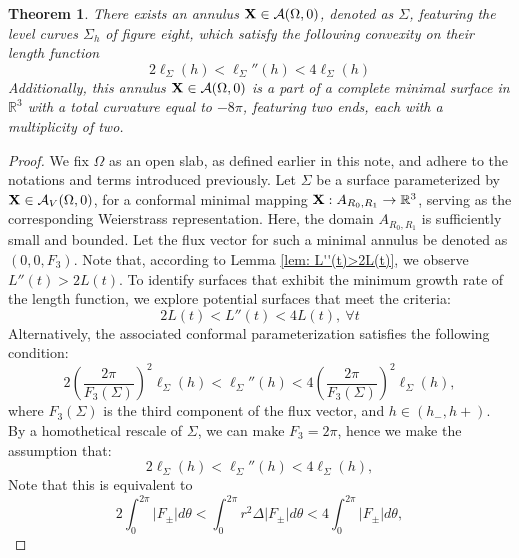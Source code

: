 \documentclass[11pt]{amsart}
\numberwithin{equation}{section}
\theoremstyle{theorem}
\newtheorem{theorem}{Theorem}[section]
\theoremstyle{definition}
\numberwithin{equation}{section}
\begin{document}
\begin{theorem} \label{thm: annulus in A(omega, 0)}
   There exists an annulus $\bold{X}\in \mathcal{A}(\Omega ,0)$, denoted as $\Sigma$, featuring 
   the level curves $\Sigma_h$ of figure eight, which satisfy the following convexity on their length function
   $$
   2\ell_{\Sigma}(h)<\ell_{\Sigma}''(h)<4\ell_{\Sigma}(h)
   $$
   Additionally, this annulus $\bold{X} \in \mathcal{A}(\Omega ,0)$ is a part of a complete minimal surface in $\mathbb{R}^3$ with a total curvature equal to $-8\pi$, featuring two ends, each with a multiplicity of two.
\end{theorem}
\begin{proof}
    We fix $\Omega$ as an open slab, as defined earlier in this note, and adhere to the notations and terms introduced previously.
    Let $\Sigma$ be a surface parameterized by $\bold{X}\in \mathcal{A}_V(\Omega ,0)$, for a conformal minimal mapping $\bold{X} : A_{R_0,R_1} \rightarrow \mathbb{R}^3$, serving as the corresponding Weierstrass representation. Here, the domain $A_{R_0,R_1}$ is sufficiently small and bounded. Let the flux vector for such a minimal annulus be denoted as $(0,0,F_3)$. Note that, according to Lemma \ref{lem: L''(t)>2L(t)}, we observe $L''(t) > 2L(t)$. To identify surfaces that exhibit the minimum growth rate of the length function, we explore potential surfaces that meet the criteria: 
\begin{equation} \label{ineq: L for wind. 0}
2L(t) < L''(t) < 4L(t),\ \forall t
\end{equation}
Alternatively, the associated conformal parameterization satisfies the following condition: 
\begin{equation}
    \nonumber
    2(\frac{2\pi}{F_3(\Sigma)})^2 \ell_{\Sigma} (h)< \ell_{\Sigma}'' (h) < 4(\frac{2\pi}{F_3(\Sigma)})^2 \ell_{\Sigma}(h),
\end{equation}
where $F_3(\Sigma)$ is the third component of the flux vector, and $h\in (h_{-},h{+})$. By a homothetical rescale of $\Sigma$, we can make $F_3=2\pi$, hence we make the assumption that:
$$
2 \ell_{\Sigma} (h)< \ell_{\Sigma}'' (h) < 4 \ell_{\Sigma}(h),
$$
Note that this is equivalent to 
\begin{equation} \label{ineq: F for win. 0}
   2\int_{0}^{2\pi} \vert F_{\pm} \vert d\theta < \int_{0}^{2\pi} r^2 \Delta \vert F_{\pm} \vert d\theta < 4\int_{0}^{2\pi} \vert F_{\pm} \vert d\theta ,  
\end{equation}


\end{proof}
\end{document}
